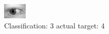 \begin{figure}[h!]
\begin{center}
\includegraphics[width=0.60\columnwidth]{figures/ID767_class_3_target_4.png}
\end{center}
\caption{ Classification: 3 actual target: 4}
\label{fig:ID767_class_3_target_4}
\end{figure}
